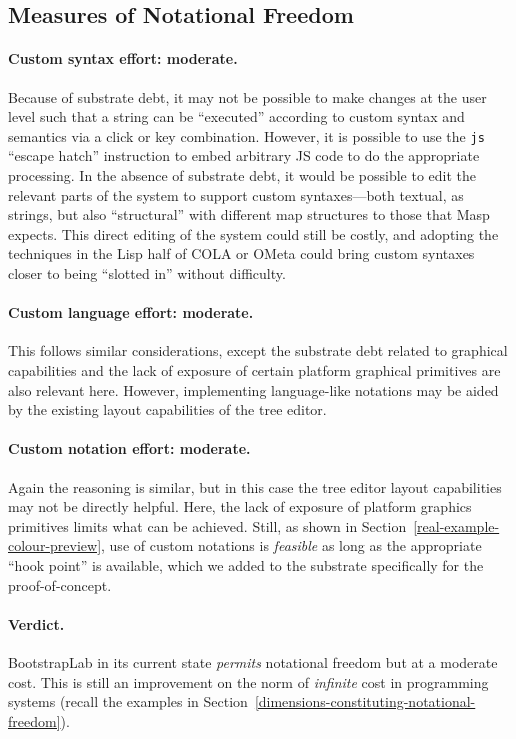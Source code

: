 \documentclass[ twoside,openright,titlepage,numbers=noenddot,headinclude,footinclude,cleardoublepage=empty,abstract=on,
                BCOR=5mm,paper=a4,fontsize=11pt
                ]{scrreprt}
\newcommand{\criterion}{\paragraph}
\theoremstyle{definition}
\begin{document}
\hypertarget{measures-of-notational-freedom}{\subsection{Measures of Notational
Freedom}\label{measures-of-notational-freedom}}

\criterion{Custom syntax effort: moderate.} Because of substrate debt,
it may not be possible to make changes at the user level such that a
string can be ``executed'' according to custom syntax and semantics via
a click or key combination. However, it is possible to use the
\texttt{js} ``escape hatch'' instruction to embed arbitrary \ac{JS} code
to do the appropriate processing. In the absence of substrate debt, it
would be possible to edit the relevant parts of the system to support
custom syntaxes---both textual, as strings, but also ``structural'' with
different map structures to those that Masp expects. This direct editing
of the system could still be costly, and adopting the techniques in the
Lisp half of \ac{COLA} \parencite{OECM} or OMeta \parencite{OMeta} could
bring custom syntaxes closer to being ``slotted in'' without difficulty.

\criterion{Custom language effort: moderate.} This follows similar
considerations, except the substrate debt related to graphical
capabilities and the lack of exposure of certain platform graphical
primitives are also relevant here. However, implementing language-like
notations may be aided by the existing layout capabilities of the tree
editor.

\criterion{Custom notation effort: moderate.} Again the reasoning is
similar, but in this case the tree editor layout capabilities may not be
directly helpful. Here, the lack of exposure of platform graphics
primitives limits what can be achieved. Still, as shown in
Section~\ref{real-example-colour-preview}, use of custom notations is
\emph{feasible} as long as the appropriate ``hook point'' is available,
which we added to the substrate specifically for the proof-of-concept.

\paragraph{Verdict.}

BootstrapLab in its current state \emph{permits} notational freedom but
at a moderate cost. This is still an improvement on the norm of
\emph{infinite} cost in programming systems (recall the examples in
Section~\ref{dimensions-constituting-notational-freedom}).
\end{document}
